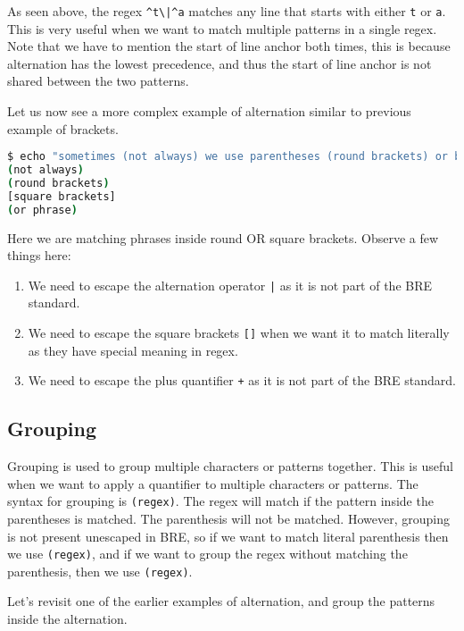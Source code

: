 As seen above, the regex \lstinline:^t\|^a: matches any line that starts with either \lstinline|t| or \lstinline|a|. This is very useful when we want to match multiple patterns in a single regex. Note that we have to mention the start of line anchor both times, this is because
alternation has the lowest precedence, and thus the start of line anchor is not shared between the two patterns.

Let us now see a more complex example of alternation similar to previous example of brackets.

\begin{lstlisting}[language=bash]
$ echo "sometimes (not always) we use parentheses (round brackets) or brackets [square brackets] to clarify some part of a sentence (or phrase)." | grep "([^)]\+)\|\[[^\]\+\]" -o
(not always)
(round brackets)
[square brackets]
(or phrase)
\end{lstlisting}

Here we are matching phrases inside round OR square brackets.
Observe a few things here:

\begin{enumerate}
  \item We need to escape the alternation operator \lstinline:|: as it is not part of the BRE standard.
  \item We need to escape the square brackets \lstinline|[]| when we want it to match literally as they have special meaning in regex.
  \item We need to escape the plus quantifier \lstinline|+| as it is not part of the BRE standard.
\end{enumerate}

\subsection{Grouping}

Grouping is used to group multiple characters or patterns together. This is useful when we want to apply a quantifier to multiple characters or patterns. The syntax for grouping is \lstinline|(regex)|. The regex will match if the pattern inside the parentheses is matched. The parenthesis will not be matched. However, grouping is not present unescaped in BRE, so if we want to match literal parenthesis then we use \lstinline|(regex)|, and if we want to group the regex without matching the parenthesis, then we use \lstinline|(regex)|.

Let's revisit one of the earlier examples of alternation, and group the patterns inside the alternation.

